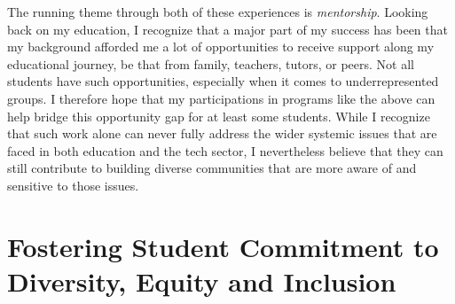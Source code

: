 \documentclass[12pt,letterpaper]{article}
\begin{document}
The running theme through both of these experiences is \emph{mentorship}.
Looking back on my education, I recognize that a major part of my success has been that my background afforded me a lot of opportunities to receive support along my educational journey, be that from family, teachers, tutors, or peers.
Not all students have such opportunities, especially when it comes to underrepresented groups.
I therefore hope that my participations in programs like the above can help bridge this opportunity gap for at least some students.
While I recognize that such work alone can never fully address the wider systemic issues that are faced in both education and the tech sector, I nevertheless believe that they can still contribute to building diverse communities that are more aware of and sensitive to those issues.

\section{Fostering Student Commitment to Diversity, Equity and Inclusion}
\end{document}
